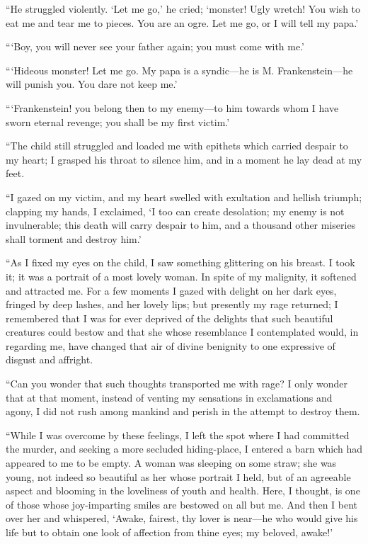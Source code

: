 \documentclass[12pt,openright]{book}
\begin{document}
“He struggled violently. ‘Let me go,’ he cried; ‘monster! Ugly wretch! You wish to eat me and tear me to pieces. You are an ogre. Let me go, or I will tell my papa.’

“‘Boy, you will never see your father again; you must come with me.’

“‘Hideous monster! Let me go. My papa is a syndic—he is M. Frankenstein—he will punish you. You dare not keep me.’

“‘Frankenstein! you belong then to my enemy—to him towards whom I have sworn eternal revenge; you shall be my first victim.’

“The child still struggled and loaded me with epithets which carried despair to my heart; I grasped his throat to silence him, and in a moment he lay dead at my feet.

“I gazed on my victim, and my heart swelled with exultation and hellish triumph; clapping my hands, I exclaimed, ‘I too can create desolation; my enemy is not invulnerable; this death will carry despair to him, and a thousand other miseries shall torment and destroy him.’

“As I fixed my eyes on the child, I saw something glittering on his breast. I took it; it was a portrait of a most lovely woman. In spite of my malignity, it softened and attracted me. For a few moments I gazed with delight on her dark eyes, fringed by deep lashes, and her lovely lips; but presently my rage returned; I remembered that I was for ever deprived of the delights that such beautiful creatures could bestow and that she whose resemblance I contemplated would, in regarding me, have changed that air of divine benignity to one expressive of disgust and affright.

“Can you wonder that such thoughts transported me with rage? I only wonder that at that moment, instead of venting my sensations in exclamations and agony, I did not rush among mankind and perish in the attempt to destroy them.

“While I was overcome by these feelings, I left the spot where I had committed the murder, and seeking a more secluded hiding-place, I entered a barn which had appeared to me to be empty. A woman was sleeping on some straw; she was young, not indeed so beautiful as her whose portrait I held, but of an agreeable aspect and blooming in the loveliness of youth and health. Here, I thought, is one of those whose joy-imparting smiles are bestowed on all but me. And then I bent over her and whispered, ‘Awake, fairest, thy lover is near—he who would give his life but to obtain one look of affection from thine eyes; my beloved, awake!’
\end{document}
